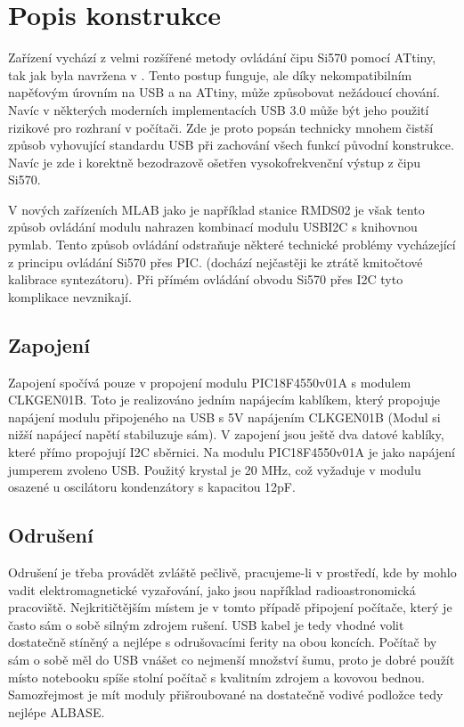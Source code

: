 \documentclass[12pt,a4paper,oneside]{article}
\begin{document}
\section{Popis konstrukce}
Zařízení vychází z velmi rozšířené metody ovládání čipu Si570 pomocí ATtiny, tak jak byla navržena v \cite{Si570board}. Tento postup funguje, ale díky nekompatibilním napěťovým úrovním na USB a na ATtiny, může způsobovat nežádoucí chování. Navíc v některých moderních implementacích USB 3.0 může být jeho použití rizikové pro rozhraní v počítači. Zde je proto popsán technicky mnohem čistší způsob vyhovující standardu USB při zachování všech funkcí původní konstrukce.
Navíc je zde i korektně bezodrazově ošetřen vysokofrekvenční výstup z čipu Si570. 

V nových zařízeních MLAB jako je například stanice RMDS02 je však tento způsob ovládání modulu nahrazen kombinací modulu USBI2C \cite{USBI2C} s knihovnou pymlab\cite{pymlab}. Tento způsob ovládání odstraňuje některé technické problémy vycházející z principu ovládání Si570 přes PIC. (dochází nejčastěji ke ztrátě kmitočtové kalibrace syntezátoru). Při přímém ovládání obvodu Si570 přes I2C tyto komplikace nevznikají. 

\subsection{Zapojení}
Zapojení spočívá pouze v propojení modulu PIC18F4550v01A s modulem CLKGEN01B. Toto je realizováno jedním napájecím kablíkem, který propojuje napájení modulu připojeného na USB s 5V napájením CLKGEN01B (Modul si nižší napájecí napětí stabiluzuje sám). V zapojení jsou ještě dva datové kablíky, které přímo propojují I2C sběrnici.
Na modulu PIC18F4550v01A je jako napájení jumperem zvoleno USB. Použitý krystal je 20 MHz, což vyžaduje v modulu osazené u oscilátoru kondenzátory s kapacitou 12pF.



\subsection{Odrušení}

Odrušení je třeba provádět zvláště pečlivě, pracujeme-li v prostředí, kde by mohlo vadit elektromagnetické vyzařování, jako jsou například radioastronomická pracoviště. Nejkritičtějším místem je v tomto případě připojení počítače, který je často sám o sobě silným zdrojem rušení. USB kabel je tedy vhodné volit dostatečně stíněný a nejlépe s odrušovacími ferity na obou koncích. Počítač by sám o sobě měl do USB vnášet co nejmenší množství šumu, proto je dobré použít místo notebooku spíše stolní počítač s kvalitním zdrojem a kovovou bednou. Samozřejmost je mít moduly přišroubované na dostatečně vodivé podložce tedy nejlépe ALBASE.  
\end{document}
